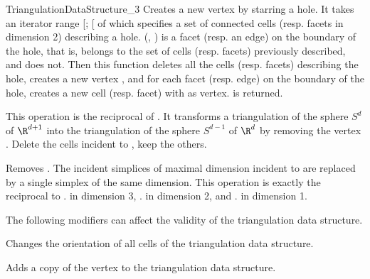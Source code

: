 \begin{ccRefConcept}{TriangulationDataStructure_3}
{Creates a new vertex by starring a hole.  It takes an iterator range
[; [ of  which specifies a set
of connected cells (resp. facets in dimension 2) describing a hole.
(, ) is a facet (resp. an edge) on the boundary of the hole,
that is,  belongs to the set of cells (resp.  facets) previously
described, and  does not.  Then this function deletes
all the cells (resp. facets) describing the hole, creates a new vertex
, and for each facet (resp. edge) on the boundary of the hole, creates
a new cell (resp. facet) with  as vertex.   is returned.
}


{This operation is the reciprocal of .
It transforms a triangulation of the sphere $S^d$ of $\R^{d+1}$ into the
triangulation of the sphere $S^{d-1}$ of $\R^{d}$ by removing the vertex
. Delete the cells incident to , keep the others.
}

{Removes . The incident simplices of maximal dimension incident to
 are replaced by a single simplex of the same dimension. This
operation is exactly the reciprocal to \ccVar. in
dimension 3, \ccVar. in dimension 2, and
\ccVar. in dimension 1.
}


\begin{ccAdvanced}
The following modifiers can affect the validity of the triangulation
data structure.

{Changes the orientation of all cells of the triangulation data structure.
}

{Adds a copy of the vertex  to the triangulation data structure.}


\end{ccAdvanced}
\end{ccRefConcept}

